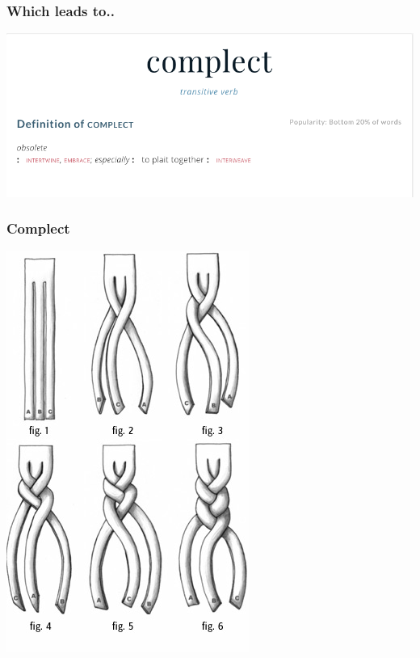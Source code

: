 \documentclass[11pt]{article}
\begin{document}
\subsubsection*{Which leads to..}
\label{sec:orgheadline13}

\includegraphics[width=.9\linewidth]{./complect.png}

\subsubsection*{Complect}
\label{sec:orgheadline14}

\includegraphics[width=.9\linewidth]{./plaiting.jpg}
\end{document}
